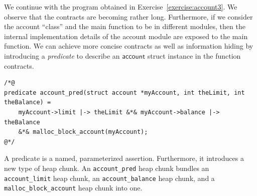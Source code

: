 \documentclass{article}
\begin{document}
We continue with the program obtained in
Exercise~\ref{exercise:account3}. We observe that the contracts
are becoming rather long. Furthermore, if we consider the
account ``class'' and the main function to be in different
modules, then the internal implementation details of the
account module are exposed to the main function. We can achieve
more concise contracts as well as information hiding by
introducing a \emph{predicate} to describe an
$\mathsf{account}$ struct instance in the function contracts.
\begin{lstlisting}
/*@
predicate account_pred(struct account *myAccount, int theLimit, int theBalance) =
    myAccount->limit |-> theLimit &*& myAccount->balance |-> theBalance
    &*& malloc_block_account(myAccount);
@*/
\end{lstlisting}
A predicate is a named, parameterized assertion. Furthermore, it introduces a new type of heap chunk.
An \lstinline!account_pred! heap chunk bundles an \lstinline!account_limit! heap chunk, an \lstinline!account_balance! heap chunk,
and a \lstinline!malloc_block_account! heap chunk into one.
\end{document}
